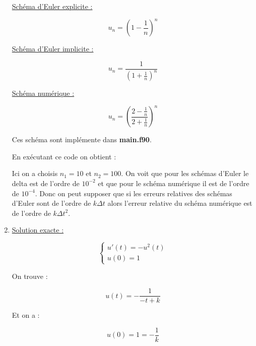 \documentclass[12pt, letterpaper]{article}
\begin{document}
\begin{enumerate}
  \underline{Schéma d'Euler explicite :}

  \begin{equation*}
    u_n = \left( 1 - \frac{1}{n} \right)^n
  \end{equation*}

  \underline{Schéma d'Euler implicite :}

  \begin{equation*}
    u_n = \frac{1}{\left( 1 + \frac{1}{n} \right)^n}
  \end{equation*}

  \underline{Schéma numérique :}

  \begin{equation*}
    u_n = \left( \frac{2 - \frac{1}{n}}{2 + \frac{1}{n}} \right)^n
  \end{equation*}

  Ces schéma sont implémente dans \textbf{main.f90}.

  \newpage

  

  En exécutant ce code on obtient :

  

  Ici on a choisis $n_1 = 10$ et $n_2 = 100$. On voit que pour les
  schémas d'Euler le delta est de l'ordre de $10^{-2}$ et que pour le
  schéma numérique il est de l'ordre de $10^{-4}$.\newline
  Donc on peut supposer que si les erreurs relatives des schémas
  d'Euler sont de l'ordre de $k \Delta t$ alors l'erreur relative du
  schéma numérique est de l'ordre de $k \Delta t^2$.

\item

  \underline{Solution exacte :}

  \begin{equation*}
    \left\{
    \begin{array}{l}
      u'(t) = - u^2 (t) \\
      u(0) = 1
    \end{array}
    \right.
  \end{equation*}

  On trouve :

  \begin{equation*}
    u(t) = - \frac{1}{- t + k}
  \end{equation*}

  Et on a :

  \begin{equation*}
    u(0) = 1 = - \frac{1}{k}
  \end{equation*}


\end{enumerate}
\end{document}
